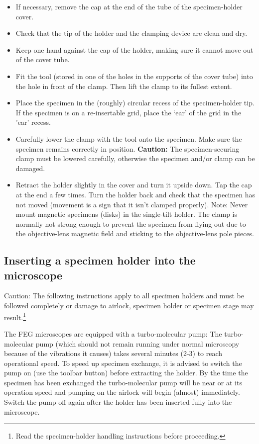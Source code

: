 \documentclass[12pt]{article}
\begin{document}
\begin{itemize}
\item  If necessary, remove the cap at the end of the tube of the
specimen-holder cover.
\item  Check that the tip of the holder and the clamping device are
clean and dry.
\item  Keep one hand against the cap of the holder, making sure it
cannot move out of the cover tube.
\item  Fit the tool (stored in one of the holes in the supports of
the cover tube) into the hole in front of the clamp. Then lift the
clamp to its fullest extent.
\item  Place the specimen in the (roughly) circular recess of the
specimen-holder tip. If the specimen is on a re-insertable grid, place
the `ear' of the grid in the 'ear' recess.
\item  Carefully lower the clamp with the tool onto the specimen. Make
sure the specimen remains correctly in position. \textbf{Caution:}
The specimen-securing clamp must be lowered carefully, otherwise the
specimen and/or clamp can be damaged.
\item  Retract the holder slightly in the cover and turn it upside down.
Tap the cap at the end a few times. Turn the holder back and check that
the specimen has not moved (movement is a sign that it isn't clamped
properly). Note: Never mount magnetic specimens (disks) in the
single-tilt holder. The clamp is normally not strong enough to prevent
the specimen from flying out due to the objective-lens magnetic field
and sticking to the objective-lens pole pieces.
\end{itemize}

\subsection{Inserting a specimen holder into the microscope}

Caution: The following instructions apply to all specimen holders and
must be followed completely or damage to airlock, specimen holder or
specimen stage may result.\footnote{Read the specimen-holder handling
instructions before proceeding.}

The FEG microscopes are equipped with a
turbo-molecular pump: The turbo-molecular pump (which should not remain
running under normal microscopy because of the vibrations it causes)
takes several minutes (2-3) to reach operational speed. To speed up
specimen exchange, it is advised to switch the pump on (use the toolbar
button) before extracting the holder. By the time the specimen has
been exchanged the turbo-molecular pump will be near or at its operation
speed and pumping on the airlock will begin (almost) immediately. Switch
the pump off again after the holder has been inserted fully into the
microscope.
\end{document}
